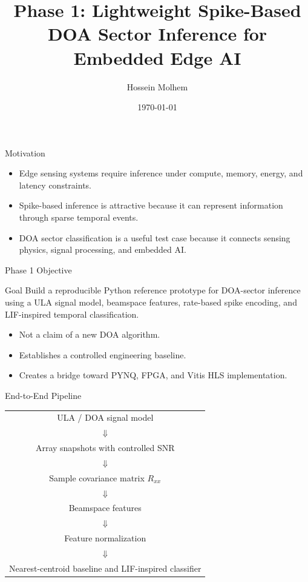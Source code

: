 \documentclass[aspectratio=169]{beamer}
\title[Phase 1 DOA/SNN Prototype]{Phase 1: Lightweight Spike-Based DOA Sector Inference for Embedded Edge AI}
\author{Hossein Molhem}
\institute{Kennesaw State University\\EE 6900 Embedded AI}
\date{\today}
\begin{document}
\begin{frame}
\titlepage
\end{frame}

\begin{frame}{Motivation}
\begin{itemize}
    \item Edge sensing systems require inference under compute, memory, energy, and latency constraints.
    \item Spike-based inference is attractive because it can represent information through sparse temporal events.
    \item DOA sector classification is a useful test case because it connects sensing physics, signal processing, and embedded AI.
\end{itemize}
\end{frame}

\begin{frame}{Phase 1 Objective}
\begin{block}{Goal}
Build a reproducible Python reference prototype for DOA-sector inference using a ULA signal model, beamspace features, rate-based spike encoding, and LIF-inspired temporal classification.
\end{block}
\vspace{0.2cm}
\begin{itemize}
    \item Not a claim of a new DOA algorithm.
    \item Establishes a controlled engineering baseline.
    \item Creates a bridge toward PYNQ, FPGA, and Vitis HLS implementation.
\end{itemize}
\end{frame}

\begin{frame}{End-to-End Pipeline}
\centering
\begin{tabular}{c}
ULA / DOA signal model \\
$\Downarrow$ \\
Array snapshots with controlled SNR \\
$\Downarrow$ \\
Sample covariance matrix $R_{xx}$ \\
$\Downarrow$ \\
Beamspace features \\
$\Downarrow$ \\
Feature normalization \\
$\Downarrow$ \\
Nearest-centroid baseline and LIF-inspired classifier
\end{tabular}
\end{frame}
\end{document}

